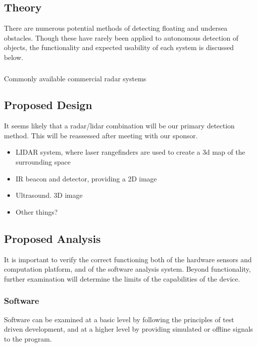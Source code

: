\subsection{\label{sec:method:theory}Theory}
There are numerous potential methods of detecting floating and undersea obstacles. Though these have rarely been applied to autonomous detection of objects, the functionality and expected usability of each system is discussed below.

\subsubsection{\label{sec:theory:radar}}
Commonly available commercial radar systems


\subsection{\label{sec:method:proposed-design}Proposed Design}
It seems likely that a radar/lidar combination will be our primary detection method.  This will be reassessed after meeting with our sponsor.


\begin{itemize}
\item LIDAR system, where laser rangefinders are used to create a 3d map of the surrounding space
\item IR beacon and detector, providing a 2D image
\item Ultrasound. 3D image
\item Other things?
\end{itemize}



\subsection{\label{sec:method:proposed-analysis}Proposed Analysis}
It is important to verify the correct functioning both of the hardware sensors and computation platform, and of the software analysis system. Beyond functionality, further examination will determine the limits of the capabilities of the device.
\subsubsection{\label{sec:method:proposed-analysis:software}Software}
Software can be examined at a basic level by following the principles of test driven development, and at a higher level by providing simulated or offline signals to the program.

